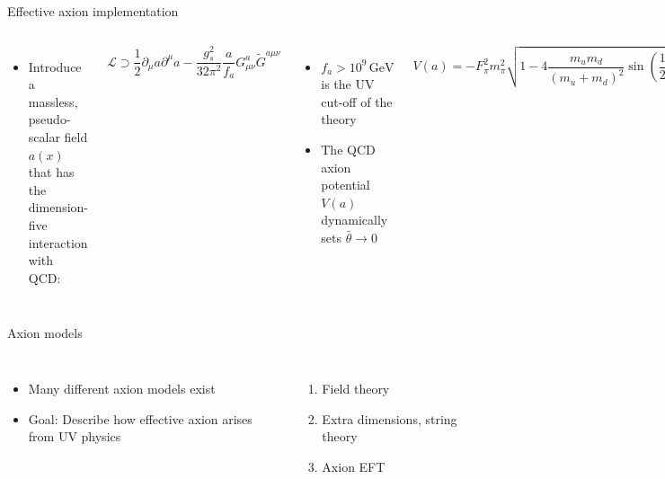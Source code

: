 \documentclass[aspectratio=1610, 9pt]{beamer}
\begin{document}
\begin{frame}{Effective axion implementation}
  \begin{columns}
    \column{\textwidth}
    \begin{itemize}
      \item Introduce a massless, pseudo-scalar field $a(x)$ that has the dimension-five interaction with QCD:
    \end{itemize}
    \begin{equation*}
      \mathcal{L} \supset \frac{1}{2} \partial_\mu a \partial^\mu a - \frac{g_s^2}{32 \pi^2} \frac{a}{f_a} G^a_{\mu \nu} \tilde{G}^{a \mu \nu}
    \end{equation*}
    \begin{itemize}
      \item $f_a > 10^{9} \, \text{GeV}$ is the UV cut-off of the theory
      \item The QCD axion potential $V(a)$ dynamically sets $\bar{\theta} \rightarrow 0$
    \end{itemize}
    \begin{equation*}
      V(a) = -F_{\pi}^2 m_{\pi}^2 \sqrt{1 - 4 \frac{m_u m_d}{(m_u + m_d)^2} \sin \left( \frac{1}{2} \left( \bar{\theta} + \frac{a}{f_a} \right) \right)^2 }
    \end{equation*}
    \begin{itemize}
      \item Axions aquire a small mass:
    \end{itemize}
    \begin{equation*}
      m_a \approx \frac{F_{\pi} m_{\pi}}{f_a} \approx 6.0 \times 10^{-6} \left( \frac{10^{12} \, \text{GeV}}{f_a} \right) \text{eV}
    \end{equation*}
  \end{columns} 
\end{frame}



\begin{frame}{Axion models}
  \begin{columns}
    \column{\textwidth}
    \begin{itemize}
    \item Many different axion models exist
    \item Goal: Describe how effective axion arises from UV physics
    \end{itemize}
    \begin{enumerate}
      \item Field theory
      \item Extra dimensions, string theory
      \item Axion EFT
    \end{enumerate}
  \end{columns} 
\end{frame}
\end{document}
